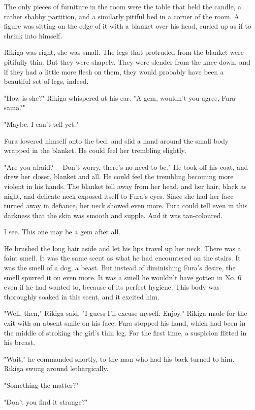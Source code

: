 The only pieces of furniture in the room were the table that held the
candle, a rather shabby partition, and a similarly pitiful bed in a
corner of the room. A figure was sitting on the edge of it with a
blanket over his head, curled up as if to shrink into himself.

Rikiga was right, she was small. The legs that protruded from the
blanket were pitifully thin. But they were shapely. They were slender
from the knee-down, and if they had a little more flesh on them, they
would probably have been a beautiful set of legs, indeed.

"How is she?" Rikiga whispered at his ear. "A gem, wouldn't you agree,
Fura-sama?"

"Maybe. I can't tell yet."

Fura lowered himself onto the bed, and slid a hand around the small body
wrapped in the blanket. He could feel her trembling slightly.

"Are you afraid? ―Don't worry, there's no need to be." He took off his
coat, and drew her closer, blanket and all. He could feel the trembling
becoming more violent in his hands. The blanket fell away from her head,
and her hair, black as night, and delicate neck exposed itself to Fura's
eyes. Since she had her face turned away in defiance, her neck showed
even more. Fura could tell even in this darkness that the skin was
smooth and supple. And it was tan-coloured.

I see. This one may be a gem after all.

He brushed the long hair aside and let his lips travel up her neck.
There was a faint smell. It was the same scent as what he had
encountered on the stairs. It was the smell of a dog, a beast. But
instead of diminishing Fura's desire, the smell spurred it on even more.
It was a smell he wouldn't have gotten in No. 6 even if he had wanted
to, because of its perfect hygiene. This body was thoroughly soaked in
this scent, and it excited him.

"Well, then," Rikiga said, "I guess I'll excuse myself. Enjoy." Rikiga
made for the exit with an absent smile on his face. Fura stopped his
hand, which had been in the middle of stroking the girl's thin leg. For
the first time, a suspicion flitted in his breast.

"Wait," he commanded shortly, to the man who had his back turned to him.
Rikiga swung around lethargically.

"Something the matter?"

"Don't you find it strange?"

